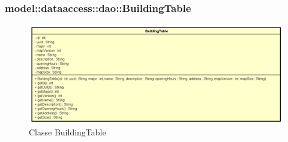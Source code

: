 \documentclass[../DefinizioneDiProdotto.tex]{subfiles}
\begin{document}
\subsubsection{model::dataaccess::dao::BuildingTable}

    \begin{figure}[H]
        \centering
        \includegraphics{img/BuildingTable.png}
        \caption{Classe BuildingTable}\label{fig:model::dataaccess::dao::BuildingTable} 
    \end{figure}
\end{document}
